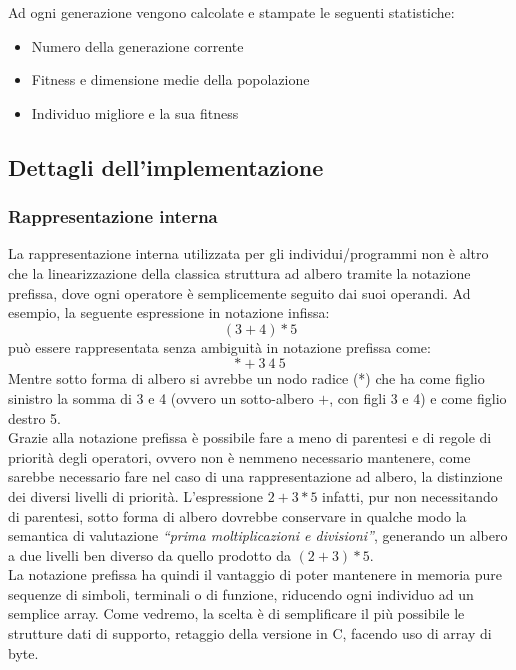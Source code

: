 \documentclass{../llncs}
\begin{document}
\noindent Ad ogni generazione vengono calcolate e stampate le seguenti statistiche:
\begin{itemize}
\setlength\itemsep{0.1em}
\item Numero della generazione corrente
\item Fitness e dimensione medie della popolazione
\item Individuo migliore e la sua fitness
\end{itemize}

\subsection{Dettagli dell'implementazione}
\subsubsection{Rappresentazione interna}
La rappresentazione interna utilizzata per gli individui/programmi non è altro che la linearizzazione della classica struttura ad albero tramite la notazione prefissa, dove ogni operatore è semplicemente seguito dai suoi operandi.
Ad esempio, la seguente espressione in notazione infissa:
\[
(3+4)*5
\]
può essere rappresentata senza ambiguità in notazione prefissa come:
\[
* + 3\:4\:5
\]
Mentre sotto forma di albero si avrebbe un nodo radice (*) che ha come figlio sinistro la somma di 3 e 4 (ovvero un sotto-albero $+$, con figli 3 e 4) e come figlio destro 5.\\

Grazie alla notazione prefissa è possibile fare a meno di parentesi e di regole di priorità degli operatori, ovvero non è nemmeno necessario mantenere, come sarebbe necessario fare nel caso di una rappresentazione ad albero, la distinzione dei diversi livelli di priorità. L'espressione $2+3*5$ infatti, pur non necessitando di parentesi, sotto forma di albero dovrebbe conservare in qualche modo la semantica di valutazione \textit{``prima moltiplicazioni e divisioni''}, generando un albero a due livelli ben diverso da quello prodotto da $(2+3)*5$.\\

La notazione prefissa ha quindi il vantaggio di poter mantenere in memoria pure sequenze di simboli, terminali o di funzione, riducendo ogni individuo ad un semplice array. Come vedremo, la scelta è di semplificare il più possibile le strutture dati di supporto, retaggio della versione in C, facendo uso di array di byte.
\end{document}
